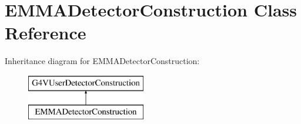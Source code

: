 \hypertarget{classEMMADetectorConstruction}{\section{E\-M\-M\-A\-Detector\-Construction Class Reference}
\label{classEMMADetectorConstruction}
}
Inheritance diagram for E\-M\-M\-A\-Detector\-Construction\-:\begin{figure}[H]
\begin{center}
\leavevmode
\includegraphics[height=2.000000cm]{classEMMADetectorConstruction}
\end{center}
\end{figure}
